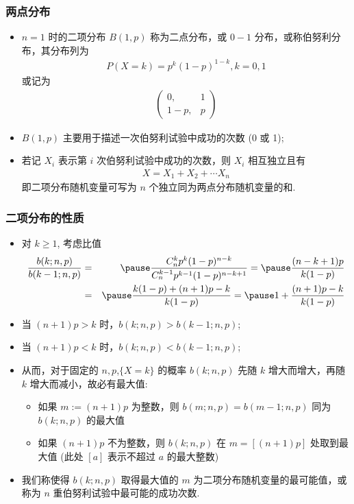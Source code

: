 \begin{frame}
	\frametitle{两点分布}
	\begin{itemize}
		\item $n=1$ 时的二项分布 $B (1,p)$ 称为二点分布，或 $0-1$ 分布，或称伯努利分布，其分布列为
		      \begin{eqnarray*}
			      P(X=k)=p^k(1-p)^{1-k}, k=0, 1
		      \end{eqnarray*}
		      或记为
		      \begin{eqnarray*}
			      \left(\begin{array}{cc}
				      0,   & 1  \\
				      1-p, & p
			      \end{array}\right)
		      \end{eqnarray*}
		\item $B (1,p)$ 主要用于描述一次伯努利试验中成功的次数 (0 或 1);
		\item 若记 $X_i$ 表示第 $i$ 次伯努利试验中成功的次数，则 $X_i$ 相互独立且有
		      \begin{eqnarray*}
			      X=X_1+X_2+\cdots X_n
		      \end{eqnarray*}
		      即二项分布随机变量可写为 $n$ 个独立同为两点分布随机变量的和.
	\end{itemize}
\end{frame}
\begin{frame}
	\frametitle{二项分布的性质}
	\begin{itemize}[<+-|alert@+>]
		\item 对 $k\ge 1$, 考虑比值
		      \begin{eqnarray*}
			      \dfrac{b(k;n,p)}{b(k-1;n,p)}&=&\pause \dfrac{C_n^kp^k(1-p)^{n-k}}{C_n^{k-1}p^{k-1}(1-p)^{n-k+1}}=\pause \dfrac{(n-k+1)p}{k(1-p)}\\
			      &=&\pause \dfrac{k(1-p)+(n+1)p-k}{k(1-p)}=\pause 1+\dfrac{(n+1)p-k}{k(1-p)}
		      \end{eqnarray*}
		\item 当 $(n+1) p>k$ 时，$b (k;n,p)>b (k-1;n,p)$;
		\item 当 $(n+1) p<k$ 时，$b (k;n,p)<b (k-1;n,p)$;
		\item 从而，对于固定的 $n,p$,$\{X=k\}$ 的概率 $b (k;n,p)$ 先随 $k$ 增大而增大，再随 $k$ 增大而减小，故必有最大值:
		      \begin{itemize}
			      \item 如果 $m:=(n+1) p$ 为整数，则 $b (m;n,p)=b (m-1;n,p)$ 同为 $b (k;n,p)$ 的最大值
			      \item 如果 $(n+1) p$ 不为整数，则 $b (k;n,p)$ 在 $m=[(n+1) p]$ 处取到最大值 (此处 $[a]$ 表示不超过 $a$ 的最大整数)
		      \end{itemize}
		\item 我们称使得 $b (k;n,p)$ 取得最大值的 $m$ 为二项分布随机变量的最可能值，或称为 $n$ 重伯努利试验中最可能的成功次数.
	\end{itemize}
\end{frame}


